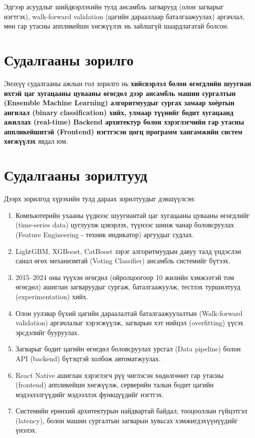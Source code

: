Эдгээр асуудлыг шийдвэрлэхийн тулд ансамбль загварууд (олон загварыг нэгтгэх), walk-forward validation (цагийн дарааллаар баталгаажуулах) аргачлал, мөн гар утасны аппликейшн хөгжүүлэх нь зайлшгүй шаардлагатай болсон.

\section*{Судалгааны зорилго}

Энэхүү судалгааны ажлын гол зорилго нь \textbf{хийсвэрлэл болон өгөгдлийн шуугиан ихтэй цаг хугацааны цувааны өгөгдөл дээр ансамбль машин сургалтын (Ensemble Machine Learning) алгоритмуудыг сургах замаар хоёртын ангилал (binary classification) хийх, улмаар түүнийг бодит хугацаанд ажиллах (real-time) Backend архитектур болон хэрэглэгчийн гар утасны аппликейшнтэй (Frontend) нэгтгэсэн цогц программ хангамжийн систем хөгжүүлэх} явдал юм.

\section*{Судалгааны зорилтууд}

Дээрх зорилгод хүрэхийн тулд дараах зорилтуудыг дэвшүүлсэн:

\begin{enumerate}
    \item Компьютерийн ухааны үүднээс шуугиантай цаг хугацааны цувааны өгөгдлийг (time-series data) цуглуулж цэвэрлэх, түүнээс шинж чанар боловсруулах (Feature Engineering - техник индикатор) аргуудыг судлах.
    \item LightGBM, XGBoost, CatBoost зэрэг алгоритмуудын давуу талд үндэслэн санал өгөх механизмтай (Voting Classifier) ансамбль системийг бүтээх.
    \item 2015--2024 оны түүхэн өгөгдөл (ойролцоогоор 10 жилийн хэмжээтэй том өгөгдөл) ашиглан загваруудыг сургаж, баталгаажуулж, тестлэх туршилтууд (experimentation) хийх.
    \item Олон уулзвар бүхий цагийн дараалалтай баталгаажуулалтын (Walk-forward validation) аргачлалыг хэрэгжүүлж, загварын хэт нийцэл (overfitting) үүсэх эрсдэлийг бууруулах.
    \item Загварыг бодит цагийн өгөгдөл боловсруулах урсгал (Data pipeline) болон API (backend) бүтэцтэй холбож автоматжуулах.
    \item React Native ашиглан хэрэглэгч рүү чиглэсэн хөдөлгөөнт гар утасны (frontend) аппликейшн хөгжүүлж, серверийн талын бодит цагийн мэдээлэлгүүдийг мэдээллэх функцүүдийг нэгтгэх.
    \item Системийн ерөнхий архитектурын найдвартай байдал, тооцооллын гүйцэтгэл (latency), болон машин сургалтын загварын хувьсах хэмжигдэхүүнүүдийг үнэлэх.
\end{enumerate}

